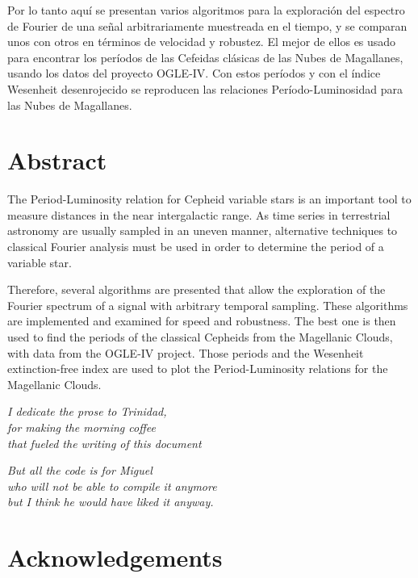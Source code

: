 \documentclass[12pt,letterpaper,oneside]{book}
\begin{document}
Por lo tanto aquí se presentan varios algoritmos para la exploración del espectro de Fourier de una señal arbitrariamente muestreada en el tiempo,
y se comparan unos con otros en términos de velocidad y robustez.
El mejor de ellos es usado para encontrar los períodos de las Cefeidas clásicas de las Nubes de Magallanes, usando los datos del proyecto OGLE-IV.
Con estos períodos y con el índice Wesenheit desenrojecido se reproducen las relaciones Período-Luminosidad para las Nubes de Magallanes.

\chapter*{Abstract}

The Period-Luminosity relation for Cepheid variable stars is an important tool to measure distances in the near intergalactic range. 
As time series in terrestrial astronomy are usually sampled in an uneven manner, 
alternative techniques to classical Fourier analysis must be used in order to determine the period of a variable star.

Therefore, several algorithms are presented that allow the exploration of the Fourier spectrum of a signal with arbitrary temporal sampling.
These algorithms are implemented and examined for speed and robustness. 
The best one is then used to find the periods of the classical Cepheids from the Magellanic Clouds, with data from the OGLE-IV project. 
Those periods and the Wesenheit extinction-free index are used to plot the Period-Luminosity relations for the Magellanic Clouds.


\newpage

\begin{flushright}
	\textit{
		I dedicate the prose to Trinidad,        \\
		for making the morning coffee            \\
		that fueled the writing of this document
	}

	\vspace{5mm}

	\textit{
		But all the code is for Miguel             \\
		who will not be able to compile it anymore \\ 
		but I think he would have liked it anyway.
	}
\end{flushright}

\vspace{2mm}

\chapter*{Acknowledgements}
\end{document}

